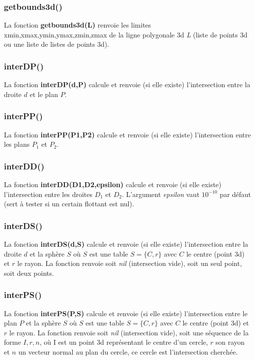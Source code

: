 \subsubsection{getbounds3d()}
La fonction \textbf{getbounds3d(L)} renvoie les limites xmin,xmax,ymin,ymax,zmin,zmax de la ligne polygonale 3d \emph{L} (liste de points 3d ou une liste de listes de points 3d).

\subsubsection{interDP()}
La fonction \textbf{interDP(d,P)} calcule et renvoie (si elle existe) l'intersection entre la droite $d$ et le plan $P$.

\subsubsection{interPP()}
La fonction \textbf{interPP(P1,P2)} calcule et renvoie (si elle existe) l'intersection entre les plans $P_1$ et $P_2$.

\subsubsection{interDD()}
La fonction \textbf{interDD(D1,D2,epsilon)} calcule et renvoie (si elle existe) l'intersection entre les droites $D_1$ et $D_2$. L'argument \emph{epsilon} vaut $10^{-10}$ par défaut (sert à tester si un certain flottant est nul).

\subsubsection{interDS()}
La fonction \textbf{interDS(d,S)} calcule et renvoie (si elle existe) l'intersection entre la droite $d$ et la sphère $S$ où $S$ est une table $S=\{C,r\}$ avec $C$ le centre (point 3d) et $r$ le rayon. La fonction renvoie soit \emph{nil} (intersection vide), soit un seul point, soit deux points.

\subsubsection{interPS()}
La fonction \textbf{interPS(P,S)} calcule et renvoie (si elle existe) l'intersection entre le plan $P$ et la sphère $S$ où $S$ est une table $S=\{C,r\}$ avec $C$ le centre (point 3d) et $r$ le rayon. La fonction renvoie soit \emph{nil} (intersection vide), soit une séquence de la forme $I,r,n$, où I est un point 3d représentant le centre d'un cercle, $r$ son rayon et $n$ un vecteur normal au plan du cercle, ce cercle est l'intersection cherchée. 

